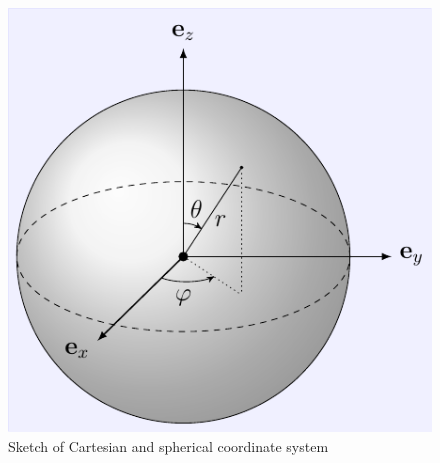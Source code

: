 \begin{figure}[tbp]
  \centering
  \includegraphics[]{Plots/cache/coordinate.pdf}
  \caption{Sketch of Cartesian and spherical coordinate system}
  \label{fig:Th-coordinate}
\end{figure}

